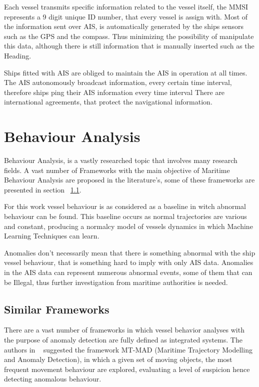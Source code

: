 Each vessel transmits specific information related to the vessel itself, the MMSI represents a 9 digit unique ID number, that every vessel is assign with.
Most of the information sent over AIS, is automatically generated by the ships sensors such as the GPS and the compass. Thus minimizing the possibility of manipulate this data, although there is still information that is manually inserted such as the Heading.

Ships fitted with AIS are obliged to maintain the AIS in operation at all times. The AIS autonomously broadcast information, every certain time interval, therefore ships ping their AIS information every time interval   There are international agreements, that protect the navigational information.


\section{Behaviour Analysis}
Behaviour Analysis, is a vastly researched topic that involves many research fields. A vast number of Frameworks with the main objective of Maritime Behaviour Analysis are proposed in the literature's, some of these frameworks are presented in section ~\ref{section: Similar Frameworks}.

For this work vessel behaviour is as considered as a baseline in witch abnormal behaviour can be found. This baseline occurs as normal trajectories are various and constant, producing a normalcy model of vessels dynamics in which Machine Learning Techniques can learn.

Anomalies don't necessarily mean that there is something abnormal with the ship vessel behaviour, that is something hard to imply with only AIS data. Anomalies in the AIS data can represent numerous abnormal events, some of them that can be Illegal, thus further investigation from maritime authorities is needed. 

\subsection{Similar Frameworks}
\label{section: Similar Frameworks}

There are a vast number of frameworks in which vessel behavior analyses with the purpose of anomaly detection are fully defined as integrated systems. The authors in ~\cite{Lei2016} suggested the framework MT-MAD (Maritime Trajectory Modelling and Anomaly Detection), in which a given set of moving objects, the most frequent movement behaviour are explored, evaluating a level of suspicion hence detecting anomalous behaviour.

